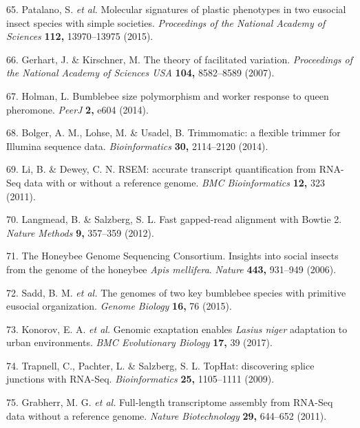 \documentclass[12pt,]{article}
\begin{document}
\hypertarget{ref-Patalano:2015vl}{}
65. Patalano, S. \emph{et al.} Molecular signatures of plastic
phenotypes in two eusocial insect species with simple societies.
\emph{Proceedings of the National Academy of Sciences} \textbf{112,}
13970--13975 (2015).

\hypertarget{ref-Gerhart:2007eq}{}
66. Gerhart, J. \& Kirschner, M. The theory of facilitated variation.
\emph{Proceedings of the National Academy of Sciences USA} \textbf{104,}
8582--8589 (2007).

\hypertarget{ref-Holman:2014jq}{}
67. Holman, L. Bumblebee size polymorphism and worker response to queen
pheromone. \emph{PeerJ} \textbf{2,} e604 (2014).

\hypertarget{ref-Bolger:2014ek}{}
68. Bolger, A. M., Lohse, M. \& Usadel, B. Trimmomatic: a flexible
trimmer for Illumina sequence data. \emph{Bioinformatics} \textbf{30,}
2114--2120 (2014).

\hypertarget{ref-Li:2011cb}{}
69. Li, B. \& Dewey, C. N. RSEM: accurate transcript quantification from
RNA-Seq data with or without a reference genome. \emph{BMC
Bioinformatics} \textbf{12,} 323 (2011).

\hypertarget{ref-Langmead:2012ka}{}
70. Langmead, B. \& Salzberg, S. L. Fast gapped-read alignment with
Bowtie 2. \emph{Nature Methods} \textbf{9,} 357--359 (2012).

\hypertarget{ref-Consortium:2006wj}{}
71. The Honeybee Genome Sequencing Consortium. Insights into social
insects from the genome of the honeybee \emph{Apis mellifera}.
\emph{Nature} \textbf{443,} 931--949 (2006).

\hypertarget{ref-BenMSadd:2015bq}{}
72. Sadd, B. M. \emph{et al.} The genomes of two key bumblebee species
with primitive eusocial organization. \emph{Genome Biology} \textbf{16,}
76 (2015).

\hypertarget{ref-Konorov:2017ft}{}
73. Konorov, E. A. \emph{et al.} Genomic exaptation enables \emph{Lasius
niger} adaptation to urban environments. \emph{BMC Evolutionary Biology}
\textbf{17,} 39 (2017).

\hypertarget{ref-Trapnell:2009dp}{}
74. Trapnell, C., Pachter, L. \& Salzberg, S. L. TopHat: discovering
splice junctions with RNA-Seq. \emph{Bioinformatics} \textbf{25,}
1105--1111 (2009).

\hypertarget{ref-Grabherr:2011jb}{}
75. Grabherr, M. G. \emph{et al.} Full-length transcriptome assembly
from RNA-Seq data without a reference genome. \emph{Nature
Biotechnology} \textbf{29,} 644--652 (2011).
\end{document}
